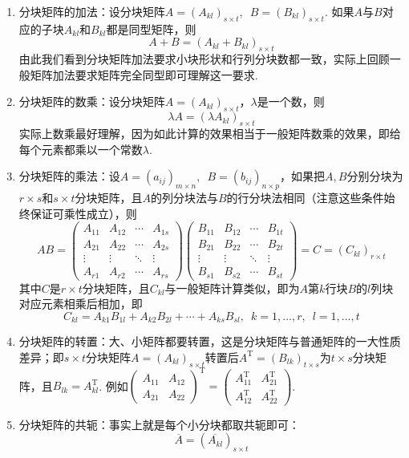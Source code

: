 \begin{enumerate}
    \item 分块矩阵的加法：设分块矩阵$A=(A_{kl})_{s \times t},\enspace B=(B_{kl})_{s \times t}$. 如果$A$与$B$对应的子块$A_{kl}$和$B_{kl}$都是同型矩阵，则
          \[A+B=(A_{kl}+B_{kl})_{s \times t}\]
          由此我们看到分块矩阵加法要求小块形状和行列分块数都一致，实际上回顾一般矩阵加法要求矩阵完全同型即可理解这一要求.

    \item 分块矩阵的数乘：设分块矩阵$A=(A_{kl})_{s \times t}$，$\lambda$是一个数，则
          \[\lambda A=(\lambda A_{kl})_{s \times t}\]
          实际上数乘最好理解，因为如此计算的效果相当于一般矩阵数乘的效果，即给每个元素都乘以一个常数$\lambda$.

    \item 分块矩阵的乘法：设$A=(a_{ij})_{m \times n},\enspace B=(b_{ij})_{n \times p}$，如果把$A,B$分别分块为$r \times s$和$s \times t$分块矩阵，且$A$的列分块法与$B$的行分块法相同（注意这些条件始终保证可乘性成立），则
          \[AB=\begin{pmatrix}
                  A_{11} & A_{12} & \cdots & A_{1s} \\
                  A_{21} & A_{22} & \cdots & A_{2s} \\
                  \vdots & \vdots & \ddots & \vdots \\
                  A_{r1} & A_{r2} & \cdots & A_{rs}
              \end{pmatrix}\begin{pmatrix}
                  B_{11} & B_{12} & \cdots & B_{1t} \\
                  B_{21} & B_{22} & \cdots & B_{2t} \\
                  \vdots & \vdots & \ddots & \vdots \\
                  B_{s1} & B_{s2} & \cdots & B_{st}
              \end{pmatrix}=C=(C_{kl})_{r \times t}\]
          其中$C$是$r \times t$分块矩阵，且$C_{kl}$与一般矩阵计算类似，即为$A$第$k$行块$B$的$l$列块对应元素相乘后相加，即
          \[C_{kl}=A_{k1}B_{1l}+A_{k2}B_{2l}+\cdots+A_{ks}B_{sl},\enspace k=1,\ldots,r,\enspace l=1,\ldots,t\]

    \item 分块矩阵的转置：大、小矩阵都要转置，这是分块矩阵与普通矩阵的一大性质差异；即$s \times t$分块矩阵$A=(A_{kl})_{s \times t}$转置后$A^\mathrm{T}=(B_{lk})_{t \times s}$为$t \times s$分块矩阵，且$B_{lk}=A_{kl}^\mathrm{T}$. 例如$\begin{pmatrix}
                  A_{11} & A_{12} \\ A_{21} & A_{22}
              \end{pmatrix}^\mathrm{T}=\begin{pmatrix}
                  A_{11}^\mathrm{T} & A_{21}^\mathrm{T} \\ A_{12}^\mathrm{T} & A_{22}^\mathrm{T}
              \end{pmatrix}$.

    \item 分块矩阵的共轭：事实上就是每个小分块都取共轭即可：
          \[\overline{A}=(\overline{A_{kl}})_{s \times t}\]
\end{enumerate}

